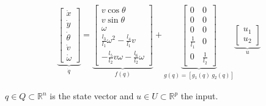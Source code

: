 \documentclass[letterpaper, 10 pt, conference]{ieeeconf}  %
\begin{document}
\begin{eqnarray}
\underbrace{\left[\begin{array}{c}
\dot{x}\\
\dot{y}\\
\dot{\theta}\\
\dot{v}\\
\dot{\omega}
\end{array}\right]}_{\dot{q}} =
\underbrace{\left[\begin{array}{c}
v\cos\theta\\
v\sin\theta\\
\omega\\
\frac{l_3}{l_1}\omega^2 - \frac{l_4}{l_1}v\\
-\frac{l_5}{l_2}v\omega - \frac{l_6}{l_2}\omega
\end{array}\right]}_{f(q)}+
\underbrace{\left[\begin{array}{cc}
0 & 0\\
0 & 0\\
0 & 0\\
\frac{1}{l_1} & 0\\
0 & \frac{1}{l_2}
\end{array}\right]}_{g(q) = [g_1(q)\ g_2(q)]}
\underbrace{\left[\begin{array}{c}
u_1\\
u_2
\end{array}\right]}_{u}
\label{eq:extendedModel}
\end{eqnarray}

${q \in Q \subset \mathds{R}^n}$ is the state vector and ${u \in U \subset \mathds{R}^p}$ the input.
\end{document}
